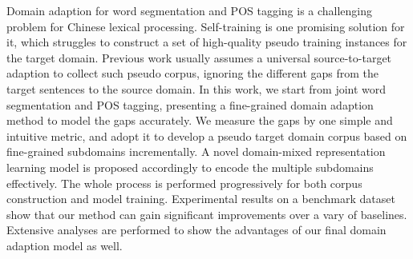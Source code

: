 Domain adaption for word segmentation and POS tagging is a challenging problem for Chinese lexical processing. Self-training is one promising solution for it, which struggles to construct a set of high-quality pseudo training instances for the target domain. Previous work usually assumes a universal source-to-target adaption to collect such pseudo corpus, ignoring the different gaps from the target sentences to the source domain. In this work, we start from joint word segmentation and POS tagging, presenting a fine-grained domain adaption method to model the gaps accurately. We measure the gaps by one simple and intuitive metric, and adopt it to develop a pseudo target domain corpus based on fine-grained subdomains incrementally. A novel domain-mixed representation learning model is proposed accordingly to encode the multiple subdomains effectively. The whole process is performed progressively for both corpus construction and model training. Experimental results on a benchmark dataset show that our method can gain significant improvements over a vary of baselines. Extensive analyses are performed to show the advantages of our final domain adaption model as well.
